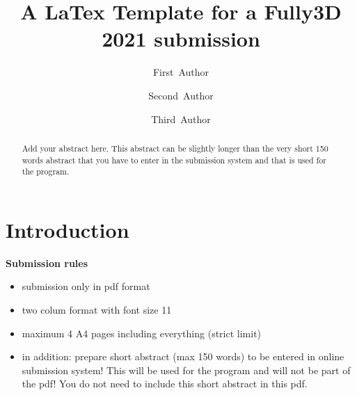 \documentclass[11pt,twocolumn,twoside]{article}
\begin{document}

\title{\sffamily\bfseries A LaTex Template for a Fully3D 2021 submission} 

\author[1]{\small First~Author}
\author[1]{\small Second~Author}
\author[2]{\small Third~Author}



\date{}

\maketitle
\thispagestyle{fancy}

\begin{abstract}
\footnotesize\bfseries

Add your abstract here. This abstract can be slightly longer than the very short 
150 words abstract that you have to enter in the submission system and that is used 
for the program. 
\end{abstract}



\section{Introduction}

\textbf{\color{red}Submission rules}
\begin{itemize}[itemsep=0pt,parsep=0pt,topsep=0pt, partopsep=0pt]
\item submission only in pdf format
\item two colum format with font size 11
\item maximum 4 A4 pages including everything (strict limit)
\item in addition: prepare short abstract (max 150 words) 
      to be entered in online submission system!
      This will be used for the program and will not be part of the pdf!
      You do not need to include this short abstract in this pdf.
\end{itemize}
\end{document}
